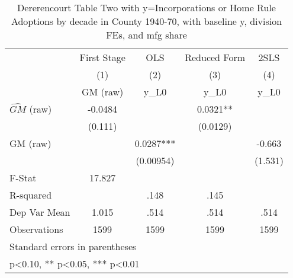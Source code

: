 \begin{table}[htbp]\centering
\def\sym#1{\ifmmode^{#1}\else\(^{#1}\)\fi}
\caption{Dererencourt Table Two with y=Incorporations or Home Rule Adoptions by decade in County 1940-70, with baseline y, division FEs, and mfg share}
\begin{tabular}{l*{4}{c}}
\toprule
                    & First Stage   &         OLS   &Reduced Form   &        2SLS   \\
                    &\multicolumn{1}{c}{(1)}&\multicolumn{1}{c}{(2)}&\multicolumn{1}{c}{(3)}&\multicolumn{1}{c}{(4)}\\
                    &\multicolumn{1}{c}{GM  (raw)}&\multicolumn{1}{c}{y\_L0}&\multicolumn{1}{c}{y\_L0}&\multicolumn{1}{c}{y\_L0}\\
\midrule
$\hat{GM}$ (raw)    &     -0.0484   &               &      0.0321** &               \\
                    &     (0.111)   &               &    (0.0129)   &               \\
\addlinespace
GM  (raw)           &               &      0.0287***&               &      -0.663   \\
                    &               &   (0.00954)   &               &     (1.531)   \\
\midrule
F-Stat              &      17.827   &               &               &               \\
R-squared           &               &        .148   &        .145   &               \\
Dep Var Mean        &       1.015   &        .514   &        .514   &        .514   \\
Observations        &        1599   &        1599   &        1599   &        1599   \\
\bottomrule
\multicolumn{5}{l}{\footnotesize Standard errors in parentheses}\\
\multicolumn{5}{l}{\footnotesize * p<0.10, ** p<0.05, *** p<0.01}\\
\end{tabular}
\end{table}

